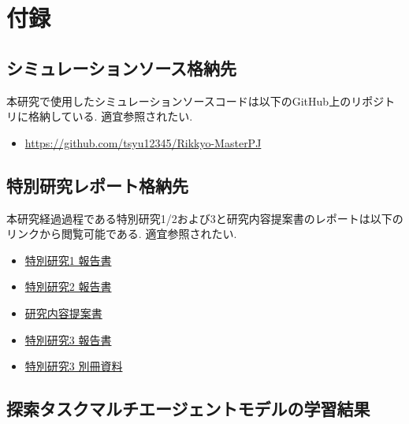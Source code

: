 \appendix
\chapter*{付録}
\section{シミュレーションソース格納先}
本研究で使用したシミュレーションソースコードは以下のGitHub上のリポジトリに格納している. 適宜参照されたい.
\begin{itemize}
  \item \url{https://github.com/tsyu12345/Rikkyo-MasterPJ}
\end{itemize}
\section{特別研究レポート格納先}
本研究経過過程である特別研究1/2および3と研究内容提案書のレポートは以下のリンクから閲覧可能である. 適宜参照されたい.
\begin{itemize}
  \item \href{https://drive.google.com/open?id=1cAxzPoKxxjQKVu29GLQ0nsldmYBtgDEn&usp=drive_fs}{特別研究1 報告書}
  \item \href{https://drive.google.com/open?id=14rU8VHIF_2HHVoE2twPA_s9i6qF9QqlJ&usp=drive_fs}{特別研究2 報告書}
  \item \href{https://drive.google.com/open?id=1cJ8v32mS4TthynS6yP99nYb8Sv3YQPLZ&usp=drive_fs}{研究内容提案書}
  \item \href{https://drive.google.com/open?id=1cLeL2UJFi6_QtMtjGqVr22aTDtoGnCT5&usp=drive_fs}{特別研究3 報告書}
  \item \href{https://drive.google.com/open?id=14ub9oX1HVd4acJh_h1ov97LJCkNjIwnq&usp=drive_fs}{特別研究3 別冊資料}
\end{itemize}

\section{探索タスクマルチエージェントモデルの学習結果}
